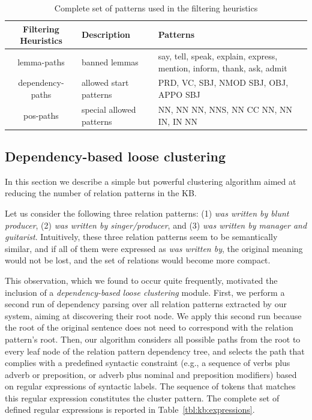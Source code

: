 \begin{table}[]
\scriptsize
\centering
    \begin{tabular}{ c l p{5cm} }
    \hline
    Filtering Heuristics & Description & Patterns \\
    \hline
    lemma-paths & banned lemmas & say, tell, speak, explain, express, mention, inform, thank, ask, admit\\
    \hline
    dependency-paths & allowed start patterns & PRD, VC, SBJ, NMOD SBJ, OBJ, APPO SBJ \\
    \hline
    pos-paths & special allowed patterns & NN, NN NN, NNS, NN CC NN, NN IN, IN NN \\
    \hline
    \end{tabular}
    \caption{Complete set of patterns used in the filtering heuristics}
    \label{tbl:kb:rules}
\end{table}

\subsection{Dependency-based loose clustering}
\label{sec:kb:method:clustering}

In this section we describe a simple but powerful clustering algorithm aimed at reducing the number of relation patterns in the KB. %

Let us consider the following three relation patterns: (1) \textit{was written by blunt producer}, (2) \textit{was written by singer/producer}, and (3) \textit{was written by manager and guitarist}. Intuitively, these three relation patterns seem to be semantically similar, and if all of them were expressed as \textit{was written by}, the original meaning would not be lost, and the set of relations would become more compact.

This observation, which we found to occur quite frequently, motivated the inclusion of a \textit{dependency-based loose clustering} module. First, we perform a second run of dependency parsing over all relation patterns extracted by our system, aiming at discovering their root node. We apply this second run because the root of the original sentence does not need to correspond with the relation pattern's root. Then, our algorithm considers all possible paths from the root to every leaf node of the relation pattern dependency tree, and selects the path that complies with a predefined syntactic constraint (e.g., a sequence of verbs plus adverb or preposition, or adverb plus nominal and preposition modifiers) based on regular expressions of syntactic labels. The sequence of tokens that matches this regular expression constitutes the cluster pattern. The complete set of defined regular expressions is reported in Table~\ref{tbl:kb:expressions}. %

